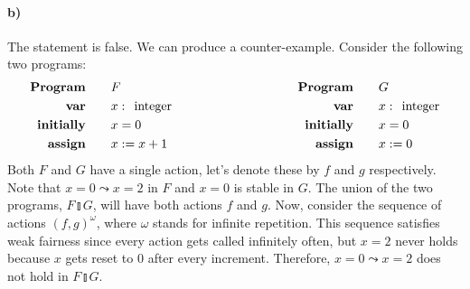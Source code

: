 \documentclass[10pt,letter]{article}
\def\fatbar{\talloblong}
\begin{document}
\pagebreak

\paragraph{b)} The statement is false. We can produce a counter-example. Consider the following two programs:
\begin{align*}
\begin{aligned}
\textrm{\textbf{Program}} \qquad & F
\\
\textrm{\textbf{var}} \qquad & x\; \textrm{:\; integer}
\\
\textrm{\textbf{initially}} \qquad & x = 0
\\
\textrm{\textbf{assign}} \qquad &
x := x + 1
\end{aligned}
\qquad \qquad \qquad \qquad \qquad
\begin{aligned}
\textrm{\textbf{Program}} \qquad & G
\\
\textrm{\textbf{var}} \qquad & x\; \textrm{:\; integer}
\\
\textrm{\textbf{initially}} \qquad & x = 0
\\
\textrm{\textbf{assign}} \qquad &
x := 0
\end{aligned}
\end{align*}
Both $F$ and $G$ have a single action, let's denote these by $f$ and $g$ respectively. Note that $x = 0 \leadsto x = 2$ in $F$ and $x = 0$ is stable in $G$. The union of the two programs, $F \fatbar G$, will have both actions $f$ and $g$. Now, consider the sequence of actions $(f, g)^\omega$, where $\omega$ stands for infinite repetition. This sequence satisfies weak fairness since every action gets called infinitely often, but $x = 2$ never holds because $x$ gets reset to $0$ after every increment. Therefore, $x = 0 \leadsto x = 2$ does not hold in $F \fatbar G$.
\end{document}

